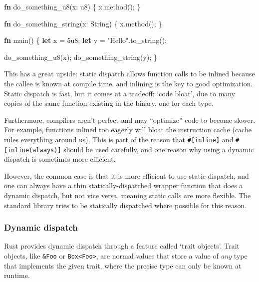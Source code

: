 \documentclass[a4paper,]{book}
\newenvironment{Shaded}{\begin{snugshade}}{\end{snugshade}}
\newcommand{\KeywordTok}[1]{\textcolor[rgb]{0.13,0.29,0.53}{\textbf{{#1}}}}
\newcommand{\DataTypeTok}[1]{\textcolor[rgb]{0.13,0.29,0.53}{{#1}}}
\newcommand{\DecValTok}[1]{\textcolor[rgb]{0.00,0.00,0.81}{{#1}}}
\newcommand{\StringTok}[1]{\textcolor[rgb]{0.31,0.60,0.02}{{#1}}}
\newcommand{\NormalTok}[1]{{#1}}
\begin{document}
\begin{Shaded}
\begin{Highlighting}[]
\KeywordTok{fn} \NormalTok{do_something_u8(x: }\DataTypeTok{u8}\NormalTok{) \{}
    \NormalTok{x.method();}
\NormalTok{\}}

\KeywordTok{fn} \NormalTok{do_something_string(x: }\DataTypeTok{String}\NormalTok{) \{}
    \NormalTok{x.method();}
\NormalTok{\}}

\KeywordTok{fn} \NormalTok{main() \{}
    \KeywordTok{let} \NormalTok{x = }\DecValTok{5u8}\NormalTok{;}
    \KeywordTok{let} \NormalTok{y = }\StringTok{"Hello"}\NormalTok{.to_string();}

    \NormalTok{do_something_u8(x);}
    \NormalTok{do_something_string(y);}
\NormalTok{\}}
\end{Highlighting}
\end{Shaded}

This has a great upside: static dispatch allows function calls to be
inlined because the callee is known at compile time, and inlining is the
key to good optimization. Static dispatch is fast, but it comes at a
tradeoff: `code bloat', due to many copies of the same function existing
in the binary, one for each type.

Furthermore, compilers aren't perfect and may ``optimize'' code to
become slower. For example, functions inlined too eagerly will bloat the
instruction cache (cache rules everything around us). This is part of
the reason that \texttt{\#{[}inline{]}} and
\texttt{\#{[}inline(always){]}} should be used carefully, and one reason
why using a dynamic dispatch is sometimes more efficient.

However, the common case is that it is more efficient to use static
dispatch, and one can always have a thin statically-dispatched wrapper
function that does a dynamic dispatch, but not vice versa, meaning
static calls are more flexible. The standard library tries to be
statically dispatched where possible for this reason.

\subsubsection{Dynamic dispatch}\label{dynamic-dispatch}

Rust provides dynamic dispatch through a feature called `trait objects'.
Trait objects, like \texttt{\&Foo} or
\texttt{Box\textless{}Foo\textgreater{}}, are normal values that store a
value of \emph{any} type that implements the given trait, where the
precise type can only be known at runtime.
\end{document}
